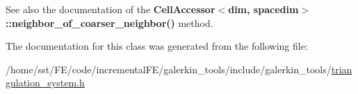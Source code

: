 See also the documentation of the {\bf Cell\+Accessor$<$dim, spacedim$>$\+::neighbor\+\_\+of\+\_\+coarser\+\_\+neighbor()} method. 

The documentation for this class was generated from the following file\+:\begin{DoxyCompactItemize}
\item 
/home/sst/\+F\+E/code/incremental\+F\+E/galerkin\+\_\+tools/include/galerkin\+\_\+tools/\hyperlink{triangulation__system_8h}{triangulation\+\_\+system.\+h}\end{DoxyCompactItemize}
